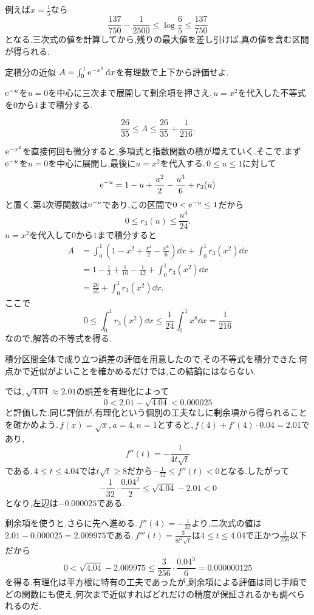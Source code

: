 例えば$x=\frac15$なら
\[
 \frac{137}{750}-\frac{1}{2500}
 \le\log\frac65\le\frac{137}{750}
\]
となる.三次式の値を計算してから,残りの最大値を差し引けば,真の値を含む区間が得られる.

\begin{example}{定積分の近似}
$A=\int_0^1\mathrm{e}^{-x^2}\,\mathrm{d} x$を有理数で上下から評価せよ.
\end{example}

$\mathrm{e}^{-u}$を$u=0$を中心に三次まで展開して剰余項を押さえ,\,$u=x^2$を代入した不等式を$0$から$1$まで積分する.

\[
 \frac{26}{35}\le A\le\frac{26}{35}+\frac1{216}.
\]

$\mathrm{e}^{-x^2}$を直接何回も微分すると,多項式と指数関数の積が増えていく.そこで,まず$\mathrm{e}^{-u}$を$u=0$を中心に展開し,最後に$u=x^2$を代入する.\,$0\le u\le1$に対して
\[
 \mathrm{e}^{-u}=1-u+\frac{u^2}{2}-\frac{u^3}{6}+r_3(u)
\]
と置く.第4次導関数は$\mathrm{e}^{-u}$であり,この区間で$0<\mathrm{e}^{-u}\le1$だから
\[
 0\le r_3(u)\le\frac{u^4}{24}.
\]
$u=x^2$を代入して$0$から$1$まで積分すると
\begin{align*}
 A&=\int_0^1\left(1-x^2+\frac{x^4}{2}-\frac{x^6}{6}\right)\dd x
       +\int_0^1r_3(x^2)\dd x\\
  &=1-\frac13+\frac1{10}-\frac1{42}
       +\int_0^1r_3(x^2)\dd x\\
  &=\frac{26}{35}+\int_0^1r_3(x^2)\dd x.
\end{align*}
ここで
\[
 0\le\int_0^1r_3(x^2)\dd x
 \le\frac1{24}\int_0^1x^8\dd x=\frac1{216}
\]
なので,解答の不等式を得る.

積分区間全体で成り立つ誤差の評価を用意したので,その不等式を積分できた.何点かで近似がよいことを確かめるだけでは,この結論にはならない.

では,\,$\sqrt{4.04}\approx2.01$の誤差を有理化によって
\[
 0<2.01-\sqrt{4.04}<0.000025
\]
と評価した.同じ評価が,有理化という個別の工夫なしに剰余項から得られることを確かめよう.\,$f(x)=\sqrt{x}$,\,$a=4$,\,$n=1$とすると,\,$f(4)+f'(4)\cdot0.04=2.01$であり,
\[
 f''(t)=-\frac1{4t\sqrt{t}}
\]
である.\,$4\le t\le4.04$では$t\sqrt{t}\ge8$だから$-\frac1{32}\le f''(t)<0$となる.したがって
\[
 -\frac1{32}\cdot\frac{0.04^2}{2}\le\sqrt{4.04}-2.01<0
\]
となり,左辺は$-0.000025$である.

剰余項を使うと,さらに先へ進める.\,$f''(4)=-\frac1{32}$より,二次式の値は$2.01-0.000025=2.009975$である.\,$f'''(t)=\frac{3}{8t^2\sqrt{t}}$は$4\le t\le4.04$で正かつ$\frac{3}{256}$以下だから
\[
 0<\sqrt{4.04}-2.009975\le\frac{3}{256}\cdot\frac{0.04^3}{6}=0.000000125
\]
を得る.有理化は平方根に特有の工夫であったが,剰余項による評価は同じ手順でどの関数にも使え,何次まで近似すればどれだけの精度が保証されるかも調べられるのだ.
